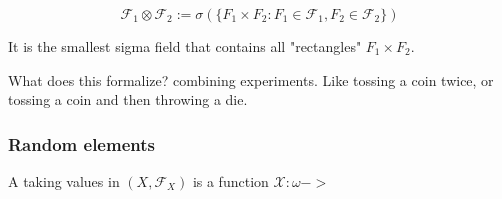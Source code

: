 \documentclass{article}
\begin{document}
\[ 
\mathcal{F}_1 \otimes \mathcal{F}_2 := \sigma(\{F_1 \times F_2 : F_1 \in \mathcal{F}_1, F_2 \in \mathcal{F}_2 \})
\]

It is the smallest sigma field that contains all "rectangles" $F_1 \times F_2$.  

What does this formalize? combining experiments. Like tossing a coin twice, or tossing a coin and then throwing a die. 

\subsubsection{Random elements}
A  taking values in $(X, \mathcal{F}_X)$ is a function $\mathcal{X}: \omega -> $
\end{document}
